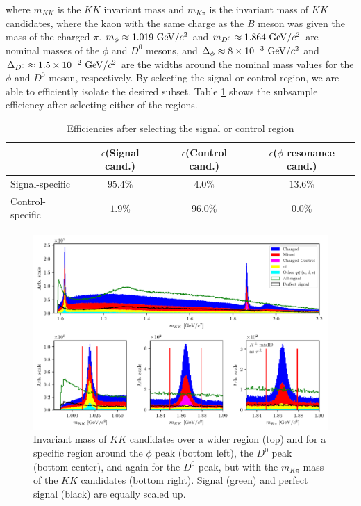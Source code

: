 where $m_{KK}$ is the $KK$ invariant mass and $m_{K\pi}$ is the invariant mass of $KK$ candidates, where the kaon with the same charge as the $B$ meson was given the mass of the charged $\pi$. $m_\phi \approx 1.019\mathrm{~GeV}/c^2$ and $m_{D^0} \approx 1.864\mathrm{~GeV}/c^2$ are nominal masses of the $\phi$ and $D^0$ mesons, and $\Delta_\phi \approx 8\times 10^{-3}\mathrm{~GeV}/c^2$ and $\Delta_{D^0} \approx 1.5\times 10^{-2}\mathrm{~GeV}/c^2$ are the widths around the nominal mass values for the $\phi$ and $D^0$ meson, respectively. By selecting the signal or control region, we are able to efficiently isolate the desired subset. Table \ref{tab:cut_eff} shows the subsample efficiency after selecting either of the regions.

\begin{table}[H]
	\centering
	\begin{tabular}{l|c|c|c}
		& $\epsilon$(Signal cand.)& $\epsilon$(Control cand.) & $\epsilon$($\phi$ resonance cand.)\\
		\toprule
		Signal-specific & $95.4\%$ & $4.0\%$ & $13.6\%$ \\
		Control-specific & $1.9\%$ & $96.0\%$ & $0.0\%$ \\
		\bottomrule
	\end{tabular}
	\caption{Efficiencies after selecting the signal or control region}
	\label{tab:cut_eff}
\end{table}


\begin{figure}[H]
	\centering
	\captionsetup{width=0.8\linewidth}
	\includegraphics[width=\linewidth]{fig/res_bkg}
	\caption{Invariant mass of $KK$ candidates over a wider region (top) and for a specific region around the $\phi$ peak (bottom left), the $D^0$ peak (bottom center), and again for the $D^0$ peak, but with the $m_{K\pi}$ mass of the $KK$ candidates (bottom right). Signal (green) and perfect signal (black) are equally scaled up.}
	\label{fig:res_bkg}
\end{figure}


